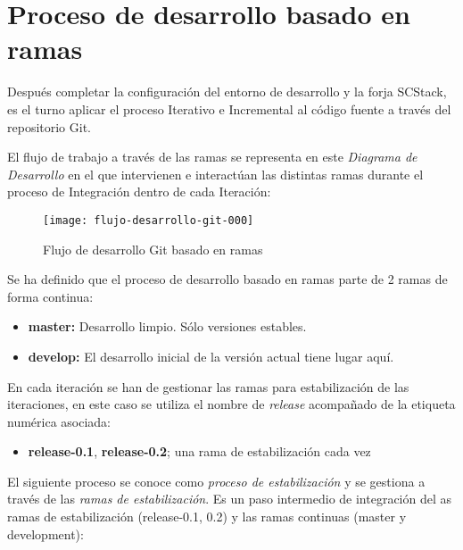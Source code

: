 

\section{Proceso de desarrollo basado en ramas}
\label{sec:desarrollo-en-ramas}

\par Después completar la configuración del entorno de desarrollo y la forja SCStack, es el turno aplicar el proceso Iterativo e Incremental al código fuente a través del repositorio Git.

\par El flujo de trabajo a través de las ramas se representa en este \emph{Diagrama de Desarrollo} en el que intervienen e interactúan las distintas ramas durante el proceso de Integración dentro de cada Iteración:

\begin{figure}[H]
    \centering
    \texttt{[image: flujo-desarrollo-git-000]}
    \caption{Flujo de desarrollo Git basado en ramas}
    \label{fig:flujo-desarrollo-git-000}
\end{figure}

\par Se ha definido que el proceso de desarrollo basado en ramas parte de 2 ramas de forma continua:

\begin{itemize}
    \item \textbf{master:} Desarrollo limpio. Sólo versiones estables.
    \item \textbf{develop:} El desarrollo inicial de la versión actual tiene lugar aquí.
\end{itemize}

\par En cada iteración se han de gestionar las ramas para estabilización de las iteraciones, en este caso se utiliza el nombre de \emph{release} acompañado de la etiqueta numérica asociada:

\begin{itemize}
    \item \textbf{release-0.1}, \textbf{release-0.2}; una rama de estabilización cada vez   
\end{itemize}

\par El siguiente proceso se conoce como \emph{proceso de estabilización} y se gestiona a través de las \emph{ramas de estabilización}. Es un paso intermedio de integración del as ramas de estabilización (release-0.1, 0.2) y las ramas continuas (master y development):


